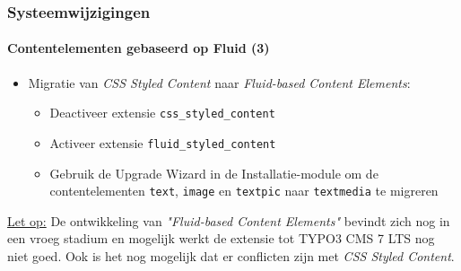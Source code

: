 \begin{frame}[fragile]
	\frametitle{Systeemwijzigingen}
	\framesubtitle{Contentelementen gebaseerd op Fluid (3)}

	\begin{itemize}

		\item Migratie van \textit{CSS Styled Content} naar \textit{Fluid-based Content Elements}:

			\begin{itemize}

				\item Deactiveer extensie \texttt{css\_styled\_content}

				\item Activeer extensie \texttt{fluid\_styled\_content}

				\item Gebruik de Upgrade Wizard in de Installatie-module om de contentelementen
					\texttt{text}, \texttt{image} en \texttt{textpic} naar \texttt{textmedia} te migreren

			\end{itemize}
	\end{itemize}

	\vspace{1.4cm}

	\begingroup
		\color{red}
			\small
				\underline{Let op:} De ontwikkeling van \textit{"Fluid-based Content Elements"} bevindt zich nog in een vroeg stadium en mogelijk werkt de extensie tot TYPO3 CMS 7 LTS nog niet goed. Ook is het nog mogelijk dat er conflicten zijn met \textit{CSS Styled Content}.
			\normalsize
	\endgroup

\end{frame}




